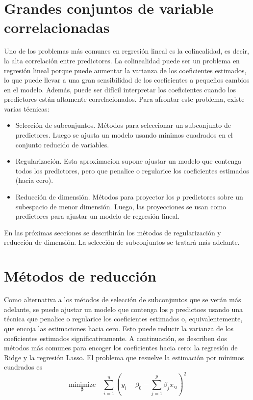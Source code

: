 \section{Grandes conjuntos de variable correlacionadas}

Uno de los problemas más comunes en regresión lineal es la colinealidad, es decir, la alta correlación entre predictores. La colinealidad puede ser un problema en regresión lineal porque puede aumentar la varianza de los coeficientes estimados, lo que puede llevar a una gran sensibilidad de los coeficientes a pequeños cambios en el modelo. Además, puede ser difícil interpretar los coeficientes cuando los predictores están altamente correlacionados. Para afrontar este problema, existe varias técnicas: 

\begin{itemize}
    \item Selección de subconjuntos. Métodos para seleccionar un subconjunto de predictores. Luego se ajusta un modelo usando mínimos cuadrados en el conjunto reducido de variables.
    \item Regularización. Esta aproximacion supone ajustar un modelo que contenga todos los predictores, pero que penalice o regularice los coeficientes estimados (hacia cero).
    \item Reducción de dimensión. Métodos para proyector los $p$ predictores sobre un subespacio de menor dimensión. Luego, las proyecciones se usan como predictores para ajustar un modelo de regresión lineal.
\end{itemize}

En las próximas secciones se describirán los métodos de regularización y reducción de dimensión. La selección de subconjuntos se tratará más adelante. 


\section{Métodos de reducción}

Como alternativa a los métodos de selección de subconjuntos que se verán más adelante, se puede ajustar un modelo que contenga los $p$ predictoes usando una técnica que penalice o regularice los coeficientes estimados o, equivalentemente, que encoja las estimaciones hacia cero. Esto puede reducir la varianza de los coeficientes estimados significativamente. A continuación, se describen dos métodos más comunes para encoger los coeficientes hacia cero: la regresión de Ridge y la regresión Lasso. El problema que resuelve la estimación por mínimos cuadrados es 
\begin{equation}
\underset{\boldsymbol{\beta}}{\text{minimize}} \quad \sum_{i=1}^{n}\left(y_i - \beta_0 - \sum_{j=1}^{p}\beta_j x_{ij}\right)^2
\end{equation}

